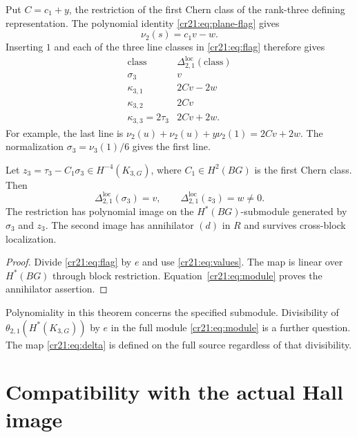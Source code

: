 Put $C=c_1+y$, the restriction of the first Chern class of the
rank-three defining representation.
The polynomial identity \eqref{cr21:eq:plane-flag} gives
\[
 \nu_2(s)=c_1v-w.
\]
Inserting $1$ and each of the three line classes in
\eqref{cr21:eq:flag} therefore gives
\begin{equation}
 \begin{array}{c|c}
 \text{class}&\Delta_{2,1}^{\mathrm{loc}}(\text{class})\\\hline
 \sigma_3&v\\
 \kappa_{3,1}&2Cv-2w\\
 \kappa_{3,2}&2Cv\\
 \kappa_{3,3}=2\tau_3&2Cv+2w.
 \end{array}
 \label{cr21:eq:values}
\end{equation}
For example, the last line is
$\nu_2(u)+\nu_2(u)+y\nu_2(1)=2Cv+2w$.
The normalization $\sigma_3=\nu_3(1)/6$ gives the first line.

\begin{theorem}
\label{cr21:thm:generators}
Let $z_3=\tau_3-C_1\sigma_3\in H^{-4}(K_{3,G})$, where
$C_1\in H^2(BG)$ is the first Chern class.
Then
\begin{equation}
 \Delta_{2,1}^{\mathrm{loc}}(\sigma_3)=v,
 \qquad \Delta_{2,1}^{\mathrm{loc}}(z_3)=w\ne0.
 \label{cr21:eq:generators}
\end{equation}
The restriction has polynomial image on the
$H^*(BG)$-submodule generated by $\sigma_3$ and $z_3$.
The second image has annihilator $(d)$ in $R$ and survives
cross-block localization.
\end{theorem}

\begin{proof}
Divide \eqref{cr21:eq:flag} by $e$ and use
\eqref{cr21:eq:values}.
The map is linear over $H^*(BG)$ through block restriction.
Equation~\eqref{cr21:eq:module} proves the annihilator assertion.
\end{proof}

Polynomiality in this theorem concerns the specified submodule.
Divisibility of $\theta_{2,1}(H^*(K_{3,G}))$ by $e$ in the full
module \eqref{cr21:eq:module} is a further question.
The map \eqref{cr21:eq:delta} is defined on the full source
regardless of that divisibility.

\section{Compatibility with the actual Hall image}
\label{cr21:sec:product}

